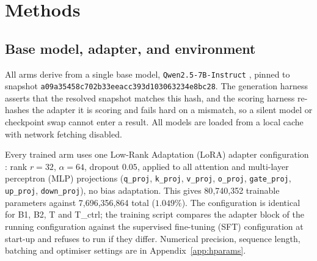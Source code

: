 
\section{Methods}
\label{sec:methods}

\subsection{Base model, adapter, and environment}
\label{sec:methods:base}

All arms derive from a single base model, \texttt{Qwen2.5-7B-Instruct}
\citep{qwen2024qwen25}, pinned to snapshot
\texttt{a09a35458c702b33eeacc393d103063234e8bc28}. The generation harness asserts that the
resolved snapshot matches this hash, and the scoring harness re-hashes the adapter it is
scoring and fails hard on a mismatch, so a silent model or checkpoint swap cannot enter a
result. All models are loaded from a local cache with network fetching disabled.

Every trained arm uses one Low-Rank Adaptation (LoRA) adapter configuration
\citep{hu2022lora}: rank $r=32$, $\alpha=64$, dropout $0.05$, applied to all attention
and multi-layer perceptron (MLP) projections
(\texttt{q\_proj}, \texttt{k\_proj}, \texttt{v\_proj}, \texttt{o\_proj},
\texttt{gate\_proj}, \texttt{up\_proj}, \texttt{down\_proj}), no bias adaptation. This
gives 80{,}740{,}352 trainable parameters against 7{,}696{,}356{,}864 total ($1.049\%$).
The configuration is identical for B1, B2, T and T\_ctrl; the training script compares
the adapter block of the running configuration against the supervised fine-tuning (SFT)
configuration at start-up and refuses to run if they differ. Numerical precision,
sequence length, batching and optimiser settings are in Appendix~\ref{app:hparams}.

